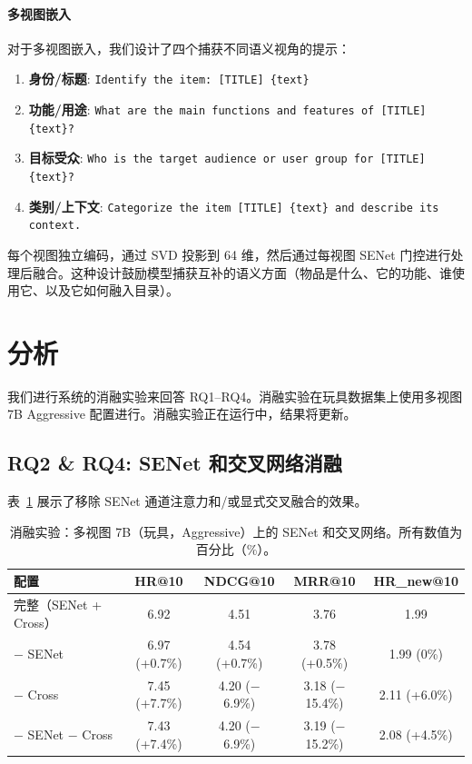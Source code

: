 \documentclass[sigconf,natbib=true]{acmart}
\begin{document}
\paragraph{多视图嵌入}
对于多视图嵌入，我们设计了四个捕获不同语义视角的提示：
\begin{enumerate}[leftmargin=*,itemsep=1pt]
  \item \textbf{身份/标题}: \texttt{Identify the item: [TITLE] \{text\}}
  \item \textbf{功能/用途}: \texttt{What are the main functions and features of [TITLE] \{text\}?}
  \item \textbf{目标受众}: \texttt{Who is the target audience or user group for [TITLE] \{text\}?}
  \item \textbf{类别/上下文}: \texttt{Categorize the item [TITLE] \{text\} and describe its context.}
\end{enumerate}
每个视图独立编码，通过 SVD 投影到 64 维，然后通过每视图 SENet 门控进行处理后融合。这种设计鼓励模型捕获互补的语义方面（物品是什么、它的功能、谁使用它、以及它如何融入目录）。

\section{分析}

我们进行系统的消融实验来回答 RQ1--RQ4。消融实验在玩具数据集上使用多视图 7B Aggressive 配置进行。消融实验正在运行中，结果将更新。

\subsection{RQ2 \& RQ4: SENet 和交叉网络消融}

表~\ref{tab:ablation_senet_cross} 展示了移除 SENet 通道注意力和/或显式交叉融合的效果。

\begin{table}[t]
\caption{消融实验：多视图 7B（玩具，Aggressive）上的 SENet 和交叉网络。所有数值为百分比（\%）。}
\label{tab:ablation_senet_cross}
\centering
\small
\begin{tabular}{lcccc}
\toprule
\textbf{配置} & HR@10 & NDCG@10 & MRR@10 & HR\_new@10 \\
\midrule
完整（SENet + Cross） & 6.92 & 4.51 & 3.76 & 1.99 \\
$-$ SENet & 6.97 (+0.7\%) & 4.54 (+0.7\%) & 3.78 (+0.5\%) & 1.99 (0\%) \\
$-$ Cross & 7.45 (+7.7\%) & 4.20 ($-$6.9\%) & 3.18 ($-$15.4\%) & 2.11 (+6.0\%) \\
$-$ SENet $-$ Cross & 7.43 (+7.4\%) & 4.20 ($-$6.9\%) & 3.19 ($-$15.2\%) & 2.08 (+4.5\%) \\
\bottomrule
\end{tabular}
\end{table}
\end{document}
